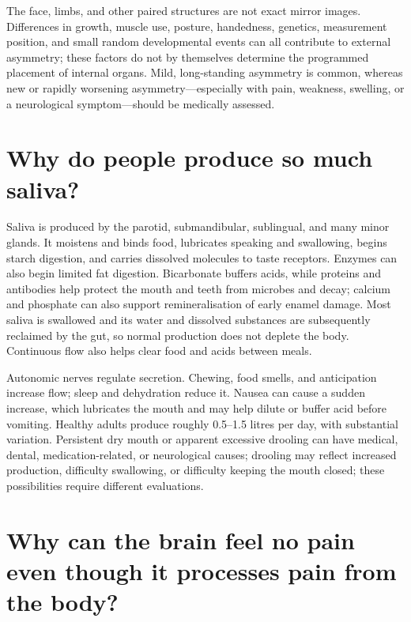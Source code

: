 \documentclass[11pt,oneside]{report}
\begin{document}
The face, limbs, and other paired structures are not exact mirror images.
Differences in growth, muscle use, posture, handedness, genetics, measurement
position, and small random developmental events can all contribute to external
asymmetry; these factors do not by themselves determine the programmed
placement of internal organs. Mild, long-standing asymmetry is common, whereas
new or rapidly worsening asymmetry---especially with pain, weakness, swelling,
or a neurological symptom---should be medically assessed.

\section{Why do people produce so much saliva?}

Saliva is produced by the parotid, submandibular, sublingual, and many minor
glands. It moistens and binds food, lubricates speaking and swallowing, begins
starch digestion, and carries dissolved molecules to taste receptors. Enzymes
can also begin limited fat digestion. Bicarbonate buffers acids, while proteins
and antibodies help protect the mouth and teeth from microbes and decay; calcium
and phosphate can also support remineralisation of early enamel damage. Most
saliva is swallowed and its water and dissolved substances are subsequently
reclaimed by the gut, so normal production does not deplete the body. Continuous
flow also helps clear food and acids between meals.

Autonomic nerves regulate secretion. Chewing, food smells, and anticipation
increase flow; sleep and dehydration reduce it. Nausea can cause a sudden
increase, which lubricates the mouth and may help dilute or buffer acid before
vomiting. Healthy adults produce roughly 0.5--1.5 litres per day, with
substantial variation. Persistent dry mouth or apparent excessive drooling can
have medical, dental, medication-related, or neurological causes; drooling may
reflect increased production, difficulty swallowing, or difficulty keeping the
mouth closed; these possibilities require different evaluations.

\section{Why can the brain feel no pain even though it processes pain from the body?}
\end{document}
